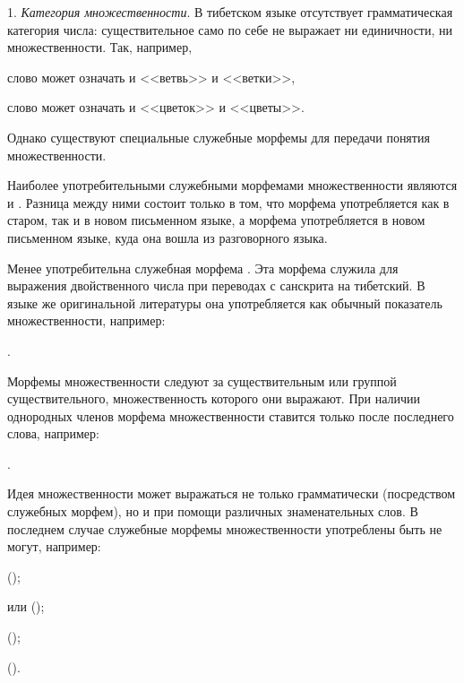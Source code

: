 1. \emph{Категория множественности}. В тибетском языке отсутствует грамматическая категория числа: существительное само по себе не выражает ни единичности, ни множественности. Так, например,
\begin{prfsample}
    \item слово  может означать и <<ветвь>> и <<ветки>>,
    \item слово  может означать и <<цветок>> и <<цветы>>.    
\end{prfsample}
Однако существуют специальные служебные морфемы для передачи понятия множественности.

Наиболее употребительными служебными морфемами множественности являются  и . Разница между ними состоит только в том, что морфема  употребляется как в старом, так и в новом письменном языке, а морфема  употребляется в новом письменном языке, куда она вошла из разговорного языка.

Менее употребительна служебная морфема .
Эта морфема служила для выражения двойственного числа при переводах с санскрита на тибетский. В языке же оригинальной литературы она употребляется как обычный показатель множественности, например:
\begin{prfsample}
    \item {}.
\end{prfsample}

Морфемы множественности следуют за существительным или группой существительного, множественность которого они выражают. При наличии однородных членов морфема множественности ставится только после последнего слова, например:
\begin{prfsample}
    \item {}.
\end{prfsample}

Идея множественности может выражаться не только грамматически (посредством служебных морфем), но и при помощи различных знаменательных слов. В последнем случае служебные морфемы множественности употреблены быть не могут, например:
\begin{prfsample}
    \item {} ();
    \item {} или  ();
    \item {} ();
    \item {} ().
\end{prfsample}


